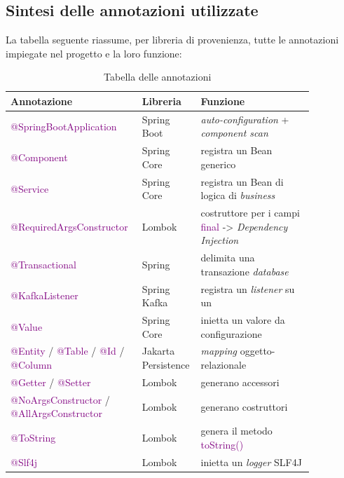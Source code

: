 \subsection{Sintesi delle annotazioni utilizzate}
La tabella seguente riassume, per libreria di provenienza, tutte le annotazioni impiegate nel progetto e la loro funzione:
\begin{table}[H]
    \setlength{\tabcolsep}{10pt} %
    \def\arraystretch{1.5} %
    \centering
    \begin{tabular}{|p{0.37\linewidth}|p{0.13\linewidth}|p{0.36\linewidth}|}
        \hline
        \textbf{Annotazione} & \textbf{Libreria} & \textbf{Funzione} \\ \hline
        \textcolor{purple}{@SpringBootApplication} & Spring Boot & \textit{auto-configuration} + \textit{component scan} \\ \hline
        \textcolor{purple}{@Component} & Spring Core & registra un \gls{Bean} generico \\ \hline
        \textcolor{purple}{@Service} & Spring Core & registra un \gls{Bean} di logica di \textit{business} \\ \hline
        \textcolor{purple}{@RequiredArgsConstructor} & Lombok & costruttore per i campi \textcolor{purple}{final} -> \textit{\gls{Dependency Injection}} \\ \hline
        \textcolor{purple}{@Transactional} & Spring & delimita una transazione \textit{database} \\ \hline
        \textcolor{purple}{@KafkaListener} & Spring Kafka & registra un \textit{listener} su un \textit{\nameref{Topic}} \\ \hline
        \textcolor{purple}{@Value} & Spring Core & inietta un valore da configurazione \\ \hline
        \textcolor{purple}{@Entity} / \textcolor{purple}{@Table} / \textcolor{purple}{@Id} / \textcolor{purple}{@Column} & \gls{Jakarta Persistence} & \textit{mapping} oggetto-relazionale \\ \hline
        \textcolor{purple}{@Getter} / \textcolor{purple}{@Setter} & Lombok & generano accessori \\ \hline
        \textcolor{purple}{@NoArgsConstructor} / \textcolor{purple}{@AllArgsConstructor} & Lombok & generano costruttori \\ \hline
        \textcolor{purple}{@ToString} & Lombok & genera il metodo \textcolor{purple}{toString()} \\ \hline
        \textcolor{purple}{@Slf4j} & Lombok & inietta un \textit{logger} \acrshort{SLF4J} \\ \hline
    \end{tabular}
    \caption{Tabella delle annotazioni}
    \label{Tabella delle annotazioni}
\end{table}

